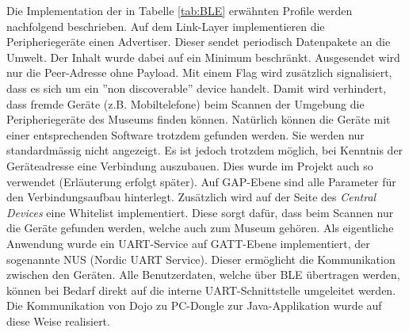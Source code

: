 Die Implementation der in Tabelle \ref{tab:BLE} erwähnten Profile werden nachfolgend beschrieben. 
Auf dem Link-Layer implementieren die Peripheriegeräte einen Advertiser. Dieser sendet periodisch Datenpakete an die Umwelt. Der Inhalt wurde dabei auf ein Minimum beschränkt. Ausgesendet wird nur die Peer-Adresse ohne Payload. Mit einem Flag wird zusätzlich signalisiert, 
dass es sich um ein ''non discoverable'' device handelt. 
Damit wird verhindert, dass fremde Geräte (z.B. Mobiltelefone) beim Scannen der Umgebung die Peripheriegeräte des Museums 
finden können. 
Natürlich können die Geräte mit einer entsprechenden Software trotzdem gefunden werden. Sie werden nur standardmässig nicht angezeigt.
Es ist jedoch trotzdem möglich, bei Kenntnis der Geräteadresse eine Verbindung auszubauen. Dies wurde im Projekt auch so verwendet (Erläuterung erfolgt später).
Auf GAP-Ebene sind alle Parameter für den Verbindungsaufbau hinterlegt. Zusätzlich wird auf der Seite des \textit{Central Devices} eine Whitelist implementiert. Diese sorgt dafür, dass beim Scannen nur die Geräte gefunden werden, welche auch zum Museum gehören.
Als eigentliche Anwendung wurde ein UART-Service auf GATT-Ebene implementiert, der sogenannte NUS (Nordic UART Service). Dieser ermöglicht die Kommunikation zwischen den Geräten. Alle Benutzerdaten, welche über BLE übertragen werden, können bei Bedarf direkt auf die interne UART-Schnittstelle umgeleitet werden. Die Kommunikation von Dojo zu PC-Dongle zur Java-Applikation wurde auf diese Weise realisiert.

